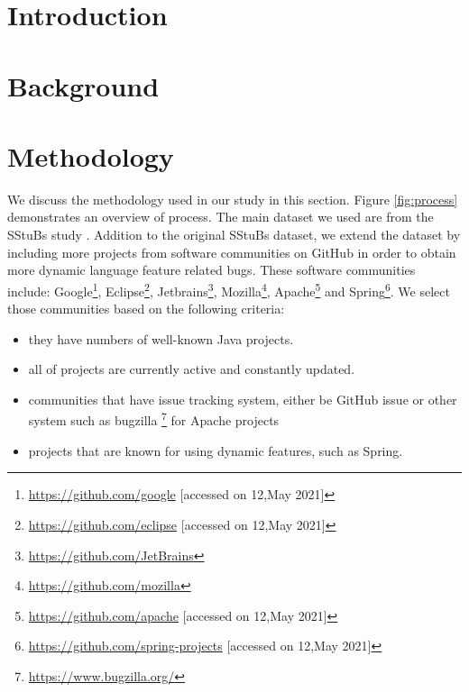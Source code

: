 \documentclass[sigconf,review,anonymous]{acmart}
\begin{document}



\maketitle

\section{Introduction}


\section{Background}



\section{Methodology}
We discuss the methodology used in our study in this section. Figure \ref{fig:process} demonstrates an overview of process. The main dataset we used are from the SStuBs study \cite{karampatsis2020often}. Addition to the original SStuBs \cite{karampatsis2020often} dataset, we extend the dataset by including more projects from software communities on GitHub in order to obtain more dynamic language feature related bugs. These software communities include: Google\footnote{\url{https://github.com/google} [accessed on 12,May 2021]}, Eclipse\footnote{\url{https://github.com/eclipse} [accessed on 12,May 2021]}, Jetbrains\footnote{\url{https://github.com/JetBrains}}, Mozilla\footnote{\url{https://github.com/mozilla}}, Apache\footnote{\url{https://github.com/apache} [accessed on 12,May 2021]} and Spring\footnote{\url{https://github.com/spring-projects} [accessed on 12,May 2021]}. We select those communities based on the following criteria: 

\begin{itemize}
\item they have numbers of well-known Java projects.
\item all of projects are currently active and constantly updated.
\item communities that have issue tracking system, either be GitHub issue or other system such as bugzilla \footnote{\url{https://www.bugzilla.org/}} for Apache projects
\item projects that are known for using dynamic features, such as Spring.
\end{itemize}
\end{document}
